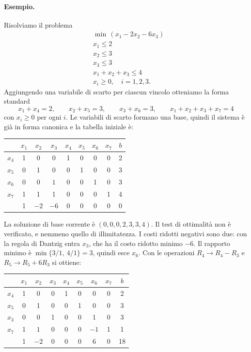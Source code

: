 \paragraph{Esempio.}
Risolviamo il problema
\[
\begin{aligned}
&\min\, (x_1 - 2x_2 - 6x_3) \\
&x_1 \le 2 \\
&x_2 \le 3 \\
&x_3 \le 3 \\
&x_1 + x_2 + x_3 \le 4 \\
&x_i \ge 0, \quad i = 1, 2, 3.
\end{aligned}
\]
Aggiungendo una variabile di scarto per ciascun vincolo otteniamo la forma standard
\[
x_1 + x_4 = 2, \qquad x_2 + x_5 = 3, \qquad x_3 + x_6 = 3, \qquad x_1 + x_2 + x_3 + x_7 = 4
\]
con $x_i \ge 0$ per ogni $i$. Le variabili di scarto formano una base, quindi il sistema è già in forma canonica e la tabella iniziale è:
\begin{center}
\begin{tabular}{c|ccccccc|c}
 & $x_1$ & $x_2$ & $x_3$ & $x_4$ & $x_5$ & $x_6$ & $x_7$ & $b$ \\
\hline
$x_4$ & 1 & 0 & 0 & 1 & 0 & 0 & 0 & 2 \\
$x_5$ & 0 & 1 & 0 & 0 & 1 & 0 & 0 & 3 \\
$x_6$ & 0 & 0 & $\boxed{1}$ & 0 & 0 & 1 & 0 & 3 \\
$x_7$ & 1 & 1 & 1 & 0 & 0 & 0 & 1 & 4 \\
\hline
 & 1 & $-2$ & $-6$ & 0 & 0 & 0 & 0 & 0 \\
\end{tabular}
\end{center}
La soluzione di base corrente è $(0, 0, 0, 2, 3, 3, 4)$. Il test di ottimalità non è verificato, e nemmeno quello di illimitatezza. I costi ridotti negativi sono due: con la regola di Dantzig entra $x_3$, che ha il costo ridotto minimo $-6$. Il rapporto minimo è $\min\{3/1,\ 4/1\} = 3$, quindi esce $x_6$. Con le operazioni $R_4 \to R_4 - R_3$ e $R_5 \to R_5 + 6R_3$ si ottiene:
\begin{center}
\begin{tabular}{c|ccccccc|c}
 & $x_1$ & $x_2$ & $x_3$ & $x_4$ & $x_5$ & $x_6$ & $x_7$ & $b$ \\
\hline
$x_4$ & 1 & 0 & 0 & 1 & 0 & 0 & 0 & 2 \\
$x_5$ & 0 & 1 & 0 & 0 & 1 & 0 & 0 & 3 \\
$x_3$ & 0 & 0 & 1 & 0 & 0 & 1 & 0 & 3 \\
$x_7$ & 1 & $\boxed{1}$ & 0 & 0 & 0 & $-1$ & 1 & 1 \\
\hline
 & 1 & $-2$ & 0 & 0 & 0 & 6 & 0 & 18 \\
\end{tabular}
\end{center}
